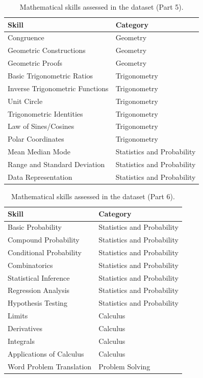 \documentclass[11pt]{article}
\begin{document}
\begin{table}
\centering
\caption{Mathematical skills assessed in the dataset (Part 5).}
\begin{tabular}{p{}p{}}
\toprule
\textbf{Skill} & \textbf{Category} \\
\midrule
Congruence & Geometry \\
Geometric Constructions & Geometry \\
Geometric Proofs & Geometry \\
Basic Trigonometric Ratios & Trigonometry \\
Inverse Trigonometric Functions & Trigonometry \\
Unit Circle & Trigonometry \\
Trigonometric Identities & Trigonometry \\
Law of Sines/Cosines & Trigonometry \\
Polar Coordinates & Trigonometry \\
Mean Median Mode & Statistics and Probability \\
Range and Standard Deviation & Statistics and Probability \\
Data Representation & Statistics and Probability \\
\bottomrule
\end{tabular}
\end{table}

\begin{table}
\centering
\caption{Mathematical skills assessed in the dataset (Part 6).}
\begin{tabular}{p{}p{}}
\toprule
\textbf{Skill} & \textbf{Category} \\
\midrule
Basic Probability & Statistics and Probability \\
Compound Probability & Statistics and Probability \\
Conditional Probability & Statistics and Probability \\
Combinatorics & Statistics and Probability \\
Statistical Inference & Statistics and Probability \\
Regression Analysis & Statistics and Probability \\
Hypothesis Testing & Statistics and Probability \\
Limits & Calculus \\
Derivatives & Calculus \\
Integrals & Calculus \\
Applications of Calculus & Calculus \\
Word Problem Translation & Problem Solving \\
\bottomrule
\end{tabular}
\end{table}
\end{document}
